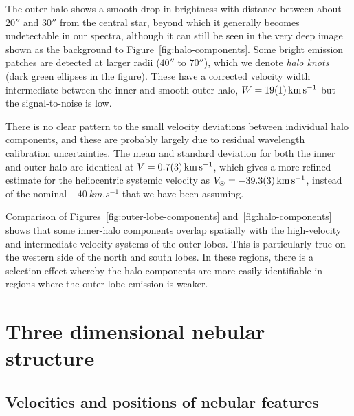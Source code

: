 \documentclass[useAMS, usenatbib]{mnras}
\begin{document}
The outer halo shows a smooth drop in brightness with distance
between about \(20''\) and \(30''\) from the central star,
beyond which it generally becomes undetectable in our spectra,
although it can still be seen in the very deep image shown as the background to Figure~\ref{fig:halo-components}.
Some bright emission patches are detected at larger radii
(\(40''\) to \(70''\)),
which we denote \textit{halo knots} (dark green ellipses in the figure).
These have a corrected velocity width intermediate between the inner and smooth outer halo,
\(W = \SI{19 \pm 1}{km.s^{-1}}\) but the signal-to-noise is low.

There is no clear pattern to the small velocity deviations between individual halo components,
and these are probably largely due to residual wavelength calibration uncertainties.
The mean and standard deviation for both the inner and outer halo are identical at \(V = \SI{+0.7 \pm 0.3}{km.s^{-1}}\),
which gives a more refined estimate for the heliocentric systemic velocity as
\(V_\odot = \SI{-39.3 \pm 0.3}{km.s^{-1}} \),
instead of the nominal \(\SI{-40}{km.s^{-1}}\) that we have been assuming.

Comparison of Figures~\ref{fig:outer-lobe-components} and~\ref{fig:halo-components}
shows that some inner-halo components overlap spatially with the high-velocity and intermediate-velocity systems of the outer lobes.
This is particularly true on the western side of the north and south lobes.
In these regions, there is a selection effect whereby
the halo components are more easily identifiable in regions where the outer lobe emission is weaker. 

\section{Three dimensional nebular structure}
\label{sec:three-dimens-struct}


\subsection{Velocities and positions of nebular features}
\label{sec:veloc-posit-three}
\end{document}
